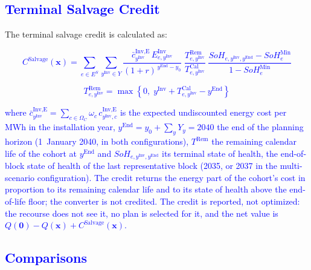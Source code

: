 \subsection{\textcolor{blue}{Terminal Salvage Credit}}
\label{app:salvage_credit}

The terminal salvage credit is calculated as:


\textcolor{blue}{
    \begin{equation}
        C^\text{Salvage}(\boldsymbol{x}) =
        \sum_{e \in E^S} \sum_{y^\text{Inv} \in Y}
        \frac{\bar{c}^{\text{Inv,E}}_{y^\text{Inv}}\, E^{\text{Inv}}_{e,y^\text{Inv}}}{(1+r)^{\,y^\text{End}-y_0}}
        \;\frac{T^\text{Rem}_{e,y^\text{Inv}}}{T^\text{Cal}_{e,y^\text{Inv}}}
        \;\frac{SoH_{e,y^\text{Inv},y^\text{End}} - SoH^{\text{Min}}_e}{1 - SoH^{\text{Min}}_e}
        \label{eq:salvage_credit}
    \end{equation}
}

\textcolor{blue}{
    \begin{equation}
        T^\text{Rem}_{e,y^\text{Inv}} = \max\left\{0,\; y^\text{Inv} + T^\text{Cal}_{e,y^\text{Inv}} - y^\text{End}\right\}
        \label{eq:salvage_remaining_life}
    \end{equation}
}

\noindent
\textcolor{blue}{
    where $\bar{c}^{\text{Inv,E}}_{y^\text{Inv}} = \sum_{c \in \Omega_C} \omega_c\, c^{\text{Inv,E}}_{y^\text{Inv},c}$ is the expected undiscounted energy cost per MWh in the installation year, $y^\text{End} = y_0 + \sum_{y} Y_y = 2040$ the end of the planning horizon (1~January 2040, in both configurations), $T^\text{Rem}$ the remaining calendar life of the cohort at $y^\text{End}$ and $SoH_{e,y^\text{Inv},y^\text{End}}$ its terminal state of health, the end-of-block state of health of the last representative block (2035, or 2037 in the multi-scenario configuration). The credit returns the energy part of the cohort's cost in proportion to its remaining calendar life and to its state of health above the end-of-life floor; the converter is not credited. 
    The credit is reported, not optimized: the recourse does not see it, no plan is selected for it, and the net value is $Q(\boldsymbol{0}) - Q(\boldsymbol{x}) + C^\text{Salvage}(\boldsymbol{x})$.
}

\subsection{\textcolor{blue}{Comparisons}}
\label{app:results_claims}

